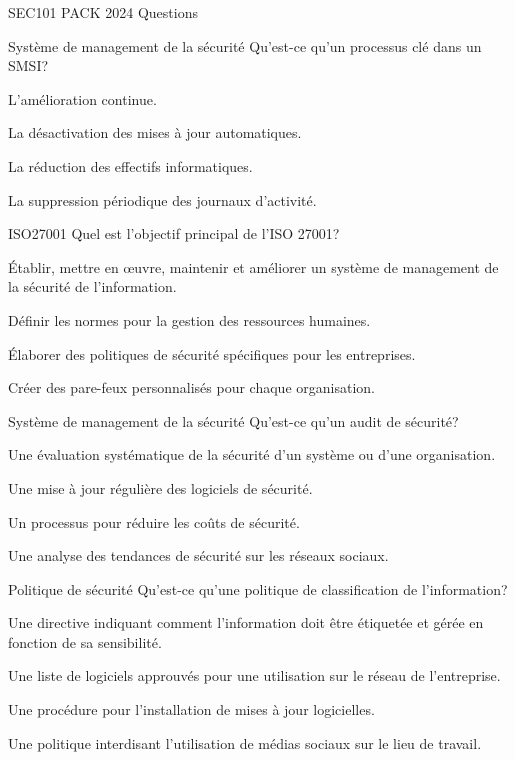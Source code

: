 \documentclass[12pt]{article}
\begin{document}
\begin{quiz}{SEC101 PACK 2024 Questions}
\begin{multi}[points=1]{Système de management de la sécurité}
Qu'est-ce qu'un processus clé dans un SMSI?
\item* L'amélioration continue.
\item La désactivation des mises à jour automatiques.
\item La réduction des effectifs informatiques.
\item La suppression périodique des journaux d'activité.
\end{multi}


\begin{multi}[points=1]{ISO27001}
Quel est l'objectif principal de l'ISO 27001?
\item* Établir, mettre en œuvre, maintenir et améliorer un système de management de la sécurité de l'information.
\item Définir les normes pour la gestion des ressources humaines.
\item Élaborer des politiques de sécurité spécifiques pour les entreprises.
\item Créer des pare-feux personnalisés pour chaque organisation.
\end{multi}

\begin{multi}[points=1]{Système de management de la sécurité}
Qu'est-ce qu'un audit de sécurité?
\item* Une évaluation systématique de la sécurité d'un système ou d'une organisation.
\item Une mise à jour régulière des logiciels de sécurité.
\item Un processus pour réduire les coûts de sécurité.
\item Une analyse des tendances de sécurité sur les réseaux sociaux.
\end{multi}

\begin{multi}[points=1]{Politique de sécurité}
Qu'est-ce qu'une politique de classification de l'information?
\item* Une directive indiquant comment l'information doit être étiquetée et gérée en fonction de sa sensibilité.
\item Une liste de logiciels approuvés pour une utilisation sur le réseau de l'entreprise.
\item Une procédure pour l'installation de mises à jour logicielles.
\item Une politique interdisant l'utilisation de médias sociaux sur le lieu de travail.
\end{multi}


\end{quiz}
\end{document}
